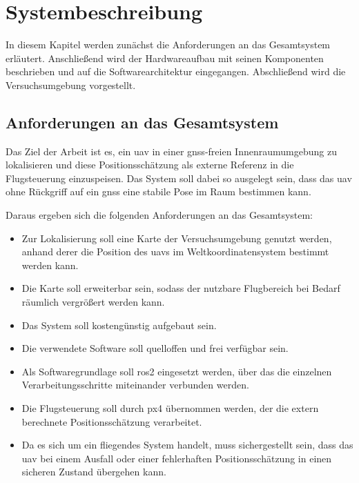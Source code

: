 
\chapter{Systembeschreibung}
\label{cap:systembeschreibung}
In diesem Kapitel werden zunächst die Anforderungen an das Gesamtsystem erläutert.
Anschließend wird der Hardwareaufbau mit seinen Komponenten beschrieben und auf die Softwarearchitektur eingegangen.
Abschließend wird die Versuchsumgebung vorgestellt.



\section{Anforderungen an das Gesamtsystem}
\label{sec:anforderungen}
Das Ziel der Arbeit ist es, ein \gls{uav} in einer \gls{gnss}-freien 
Innenraumumgebung zu lokalisieren und diese Positionsschätzung als 
externe Referenz in die Flugsteuerung einzuspeisen.
Das System soll dabei so ausgelegt sein, dass das \gls{uav} ohne 
Rückgriff auf ein \gls{gnss} eine stabile Pose im Raum bestimmen kann.

Daraus ergeben sich die folgenden Anforderungen an das Gesamtsystem:
\begin{itemize}
    \item Zur Lokalisierung soll eine Karte der Versuchsumgebung genutzt werden, anhand derer die Position des \gls{uav}s im Weltkoordinatensystem bestimmt werden kann.
    \item Die Karte soll erweiterbar sein, sodass der nutzbare Flugbereich bei Bedarf räumlich vergrößert werden kann.
    \item Das System soll kostengünstig aufgebaut sein.
    \item Die verwendete Software soll quelloffen und frei verfügbar sein.
    \item Als Softwaregrundlage soll \gls{ros2} eingesetzt werden, über das die einzelnen Verarbeitungsschritte miteinander verbunden werden.
    \item Die Flugsteuerung soll durch \gls{px4} übernommen werden, der die extern berechnete Positionsschätzung verarbeitet.
    \item Da es sich um ein fliegendes System handelt, muss sichergestellt sein, dass das \gls{uav} bei einem Ausfall oder einer fehlerhaften Positionsschätzung in einen sicheren Zustand übergehen kann.
\end{itemize}

